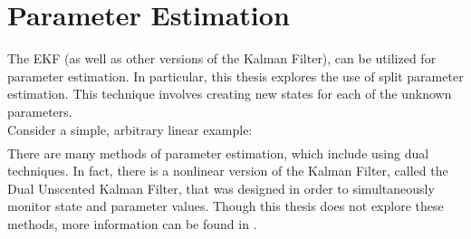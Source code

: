 \section{Parameter Estimation}
\label{Parameter Estimation}


The EKF (as well as other versions of the Kalman Filter), can be utilized for parameter estimation. In particular, this thesis explores the use of split parameter estimation. This technique involves creating new states for each of the unknown parameters. \\
Consider a simple, arbitrary linear example:
\begin{align*}

\end{align*}
There are many methods of parameter estimation, which include using dual techniques. In fact, there is a nonlinear version of the Kalman Filter, called the Dual Unscented Kalman Filter, that was designed in order to simultaneously monitor state and parameter values. Though this thesis does not explore these methods, more information can be found in \cite{inbook, article6}.

